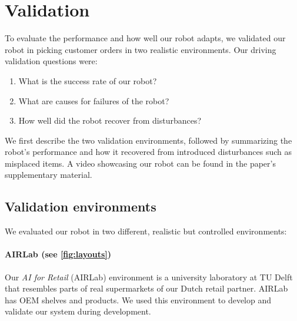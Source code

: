 \section{Validation}
\label{sec:results}

To evaluate the performance and how well our robot adapts, we validated our robot in picking customer orders in two realistic environments.
Our driving validation questions were:
\begin{enumerate}
    \item What is the success rate of our robot?
    \item What are causes for failures of the robot?
    \item How well did the robot recover from disturbances?
\end{enumerate}
We first describe the two validation environments, followed by summarizing the robot's performance and  how it recovered from introduced disturbances such as misplaced items.
A video showcasing our robot can be found in the paper's supplementary material.







\subsection{Validation environments}
We evaluated our robot in two different, realistic but controlled environments: 
\paragraph{AIRLab (see \cref{fig:layouts})}
Our \emph{AI for Retail} (AIRLab) environment is a university laboratory at TU Delft that resembles parts of real supermarkets of our Dutch retail partner.
AIRLab has OEM shelves and products. 
We used this environment to develop and validate our system during development.


